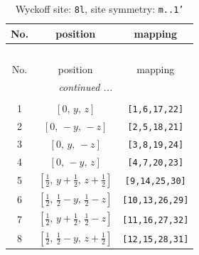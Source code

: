 \documentclass[fleqn,8pt]{jsarticle}
\begin{document}
\begin{longtable}{ccc}
\caption{Wyckoff site: {\tt 8l}, site symmetry: {\tt m..1'}}
 \\
 \hline \hline
No. & position & mapping \\ \hline \endfirsthead

\multicolumn{2}{l}{\tablename\ \thetable{}} \\
 \hline \hline
No. & position & mapping \\ \hline \endhead

 \hline \hline
\multicolumn{2}{r}{\footnotesize\it continued ...} \\ \endfoot

 \hline \hline
\multicolumn{2}{r}{} \\ \endlastfoot

1 & $\left[ 0,\, y,\, z \right]$ & {\tt [1,6,17,22]} \\ \hline
2 & $\left[ 0,\, - y,\, - z \right]$ & {\tt [2,5,18,21]} \\ \hline
3 & $\left[ 0,\, y,\, - z \right]$ & {\tt [3,8,19,24]} \\ \hline
4 & $\left[ 0,\, - y,\, z \right]$ & {\tt [4,7,20,23]} \\ \hline
5 & $\left[ \frac{1}{2},\, y + \frac{1}{2},\, z + \frac{1}{2} \right]$ & {\tt [9,14,25,30]} \\ \hline
6 & $\left[ \frac{1}{2},\, \frac{1}{2} - y,\, \frac{1}{2} - z \right]$ & {\tt [10,13,26,29]} \\ \hline
7 & $\left[ \frac{1}{2},\, y + \frac{1}{2},\, \frac{1}{2} - z \right]$ & {\tt [11,16,27,32]} \\ \hline
8 & $\left[ \frac{1}{2},\, \frac{1}{2} - y,\, z + \frac{1}{2} \right]$ & {\tt [12,15,28,31]} \\
\end{longtable}
\renewcommand{\arraystretch}{1.2}
\end{document}
